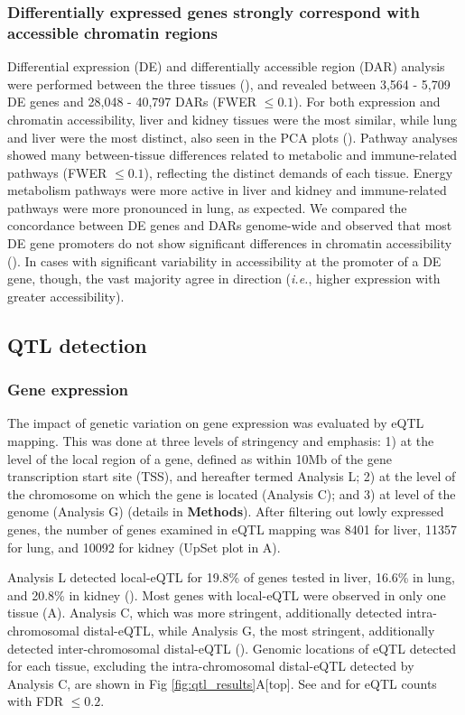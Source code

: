 \documentclass[10pt,letterpaper]{article}
\newcommand{\ie}{\emph{i.e.}\xspace}
\begin{document}
\subsubsection*{Differentially expressed genes strongly correspond with accessible chromatin regions} 
Differential expression (DE) and differentially accessible region (DAR) analysis were performed between the three tissues (), and revealed between 3,564 - 5,709 DE genes and 28,048 - 40,797 DARs (FWER $\le 0.1$). For both expression and chromatin accessibility, liver and kidney tissues were the most similar, while lung and liver were the most distinct, also seen in the PCA plots (). Pathway analyses showed many between-tissue differences related to metabolic and immune-related pathways (FWER $\le 0.1$), reflecting the distinct demands of each tissue. Energy metabolism pathways were more active in liver and kidney and immune-related pathways were more pronounced in lung, as expected. We compared the concordance between DE genes and DARs genome-wide and observed that most DE gene promoters do not show significant differences in chromatin accessibility (). In cases with significant variability in accessibility at the promoter of a DE gene, though, the vast majority agree in direction (\ie, higher expression with greater accessibility).

\subsection*{QTL detection}

\subsubsection*{Gene expression}
The impact of genetic variation on gene expression was evaluated by eQTL mapping. This was done at three levels of stringency and emphasis: 1) at the level of the local region of a gene, defined as within 10Mb of the gene transcription start site (TSS), and hereafter termed Analysis L; 2) at the level of the chromosome on which the gene is located (Analysis C); and 3) at level of the genome (Analysis G) (details in \textbf{Methods}).
After filtering out lowly expressed genes, the number of genes examined in eQTL mapping was 8401 for liver, 11357 for lung, and 10092 for kidney (UpSet plot \cite{Conway2017} in A).

Analysis L detected local-eQTL for 19.8\% of genes tested in liver, 16.6\% in lung, and 20.8\% in kidney ().
Most genes with local-eQTL were observed in only one tissue (A).
Analysis C, which was more stringent, additionally detected intra-chromosomal distal-eQTL, while Analysis G, the most stringent, additionally detected inter-chromosomal distal-eQTL ().
Genomic locations of eQTL detected for each tissue, excluding the intra-chromosomal distal-eQTL detected by Analysis C, are shown in Fig \ref{fig:qtl_results}A[top]. See  and  for eQTL counts with FDR $\le 0.2$.
\end{document}
